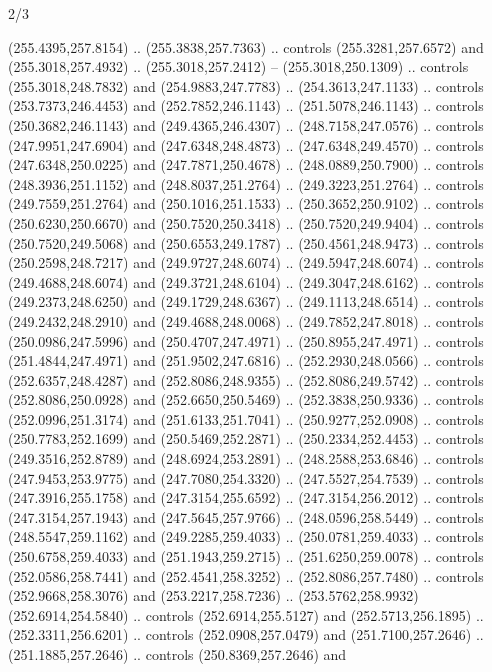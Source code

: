 \begin{flagdescription}{2/3}
\begin{scope}[xshift=0.5\flaglength,yshift=0.5\flagwidth,scale=\flagwidth/235.81]
\begin{scope}[y=0.8pt, x=0.8pt, yscale=-1,shift={(-239.08,-147.38)}]
    (255.4395,257.8154) .. (255.3838,257.7363) .. controls (255.3281,257.6572) and
    (255.3018,257.4932) .. (255.3018,257.2412) -- (255.3018,250.1309) .. controls
    (255.3018,248.7832) and (254.9883,247.7783) .. (254.3613,247.1133) .. controls
    (253.7373,246.4453) and (252.7852,246.1143) .. (251.5078,246.1143) .. controls
    (250.3682,246.1143) and (249.4365,246.4307) .. (248.7158,247.0576) .. controls
    (247.9951,247.6904) and (247.6348,248.4873) .. (247.6348,249.4570) .. controls
    (247.6348,250.0225) and (247.7871,250.4678) .. (248.0889,250.7900) .. controls
    (248.3936,251.1152) and (248.8037,251.2764) .. (249.3223,251.2764) .. controls
    (249.7559,251.2764) and (250.1016,251.1533) .. (250.3652,250.9102) .. controls
    (250.6230,250.6670) and (250.7520,250.3418) .. (250.7520,249.9404) .. controls
    (250.7520,249.5068) and (250.6553,249.1787) .. (250.4561,248.9473) .. controls
    (250.2598,248.7217) and (249.9727,248.6074) .. (249.5947,248.6074) .. controls
    (249.4688,248.6074) and (249.3721,248.6104) .. (249.3047,248.6162) .. controls
    (249.2373,248.6250) and (249.1729,248.6367) .. (249.1113,248.6514) .. controls
    (249.2432,248.2910) and (249.4688,248.0068) .. (249.7852,247.8018) .. controls
    (250.0986,247.5996) and (250.4707,247.4971) .. (250.8955,247.4971) .. controls
    (251.4844,247.4971) and (251.9502,247.6816) .. (252.2930,248.0566) .. controls
    (252.6357,248.4287) and (252.8086,248.9355) .. (252.8086,249.5742) .. controls
    (252.8086,250.0928) and (252.6650,250.5469) .. (252.3838,250.9336) .. controls
    (252.0996,251.3174) and (251.6133,251.7041) .. (250.9277,252.0908) .. controls
    (250.7783,252.1699) and (250.5469,252.2871) .. (250.2334,252.4453) .. controls
    (249.3516,252.8789) and (248.6924,253.2891) .. (248.2588,253.6846) .. controls
    (247.9453,253.9775) and (247.7080,254.3320) .. (247.5527,254.7539) .. controls
    (247.3916,255.1758) and (247.3154,255.6592) .. (247.3154,256.2012) .. controls
    (247.3154,257.1943) and (247.5645,257.9766) .. (248.0596,258.5449) .. controls
    (248.5547,259.1162) and (249.2285,259.4033) .. (250.0781,259.4033) .. controls
    (250.6758,259.4033) and (251.1943,259.2715) .. (251.6250,259.0078) .. controls
    (252.0586,258.7441) and (252.4541,258.3252) .. (252.8086,257.7480) .. controls
    (252.9668,258.3076) and (253.2217,258.7236) ..
    (253.5762,258.9932)(252.6914,254.5840) .. controls (252.6914,255.5127) and
    (252.5713,256.1895) .. (252.3311,256.6201) .. controls (252.0908,257.0479) and
    (251.7100,257.2646) .. (251.1885,257.2646) .. controls (250.8369,257.2646) and

\end{scope}
\end{scope}
\end{flagdescription}
